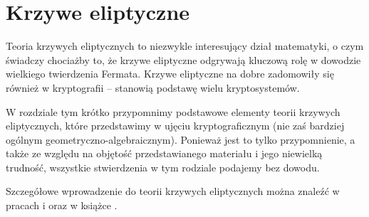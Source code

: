 \chapter{Krzywe eliptyczne}

\noindent
Teoria krzywych eliptycznych to niezwykle interesujący dział matematyki,
o czym świadczy chociażby to,
że krzywe eliptyczne odgrywają kluczową rolę
w dowodzie wielkiego twierdzenia Fermata.
Krzywe eliptyczne na dobre zadomowiły się również w kryptografii --
stanowią podstawę wielu kryptosystemów.

\noindent
W rozdziale tym krótko przypomnimy
podstawowe elementy teorii krzywych eliptycznych,
które przedstawimy w ujęciu kryptograficznym
(nie zaś bardziej ogólnym geometryczno-algebraicznym).
Ponieważ jest to tylko przypomnienie,
a także ze względu na objętość przedstawianego materiału
i jego niewielką trudność,
wszystkie stwierdzenia w tym rodziale podajemy bez dowodu.

\noindent
Szczegółowe wprowadzenie do teorii krzywych eliptycznych
można znaleźć w pracach \cite{ecintro1} i \cite{ecintro2}
oraz w książce \cite{silverman}.






